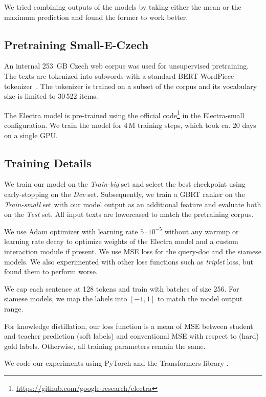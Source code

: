 \documentclass[letterpaper]{article} \usepackage{aaai22 }  \usepackage{times}  \usepackage{helvet}  \usepackage{courier}  \usepackage[hyphens]{url}  \usepackage{graphicx} \usepackage{amsmath,amsfonts,amssymb, mathabx,bm,bbm}
\begin{document}
We tried combining outputs of the models by taking either the mean or the maximum prediction and found the former to work better.



\subsection{Pretraining Small-E-Czech}
An internal 253~GB Czech web corpus was used for unsupervised pretraining. The texts are tokenized into subwords with a standard BERT WordPiece tokenizer~\cite{schuster2012japanese}. The tokenizer is trained on a subset of the corpus and its vocabulary size is limited to 30\,522 items. 

The Electra model is pre-trained using the official code\footnote{\url{https://github.com/google-research/electra}} in the Electra-small configuration. We train the model for 4\,M training steps, which took ca. 20 days on a single GPU.

\subsection{Training Details}

We train our model on the \textit{Train-big} set and select the best checkpoint using early-stopping on the \textit{Dev} set. Subsequently, we train a GBRT ranker on the \textit{Train-small} set with our model output as an additional feature and evaluate both on the \textit{Test} set. All input texts are lowercased to match the pretraining corpus.

We use Adam optimizer with learning rate $5\cdot10^{-5}$ without any warmup or learning rate decay to optimize weights of the Electra model and a custom interaction module if present. We use MSE loss for the query-doc and the siamese models. We also experimented with other loss functions such as \textit{triplet} loss, but found them to perform worse.

We cap each sentence at 128 tokens and train with batches of size 256. For siamese models, we map the labels into $[-1, 1]$ to match the model output range.

For knowledge distillation, our loss function is a mean of MSE between student and teacher prediction (soft labels) and conventional MSE with respect to (hard) gold labels. Otherwise, all training parameters remain the same.

We code our experiments using PyTorch \cite{pytorch2019} and the Transformers library \cite{transformers2020}.
\end{document}
